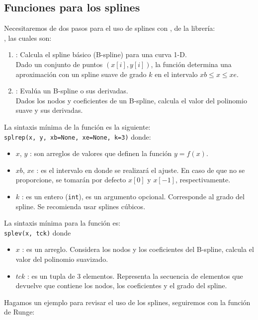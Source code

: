 \subsection*{Funciones para los splines}
Necesitaremos de dos pasos para el uso de splines con \python, de la librería: \\
, las cuales son:
\begin{enumerate}
\item {}: Calcula el spline básico (B-spline) para una curva 1-D.
\\
\medskip
Dado un conjunto de puntos $(x[i],y[i])$, la función determina una aproximación con un spline suave de grado $k$ en el intervalo $xb \leq x \leq xe$.
\item {}: Evalúa un B-spline o sus derivadas.
\\
\medskip
Dados los nodos y coeficientes de un B-spline, calcula el valor del polinomio suave y sus derivadas.
\end{enumerate}
La sintaxis mínima de la función  es la siguiente:
\\
\texttt{splrep(x, y, xb=None, xe=None, k=3)}
donde:
\begin{itemize}
\item $x$, $y$ : son arreglos de valores que definen la función $y = f(x)$.
\item $xb$, $xe$ : es el intervalo en donde se realizará el ajuste. En caso de que no se proporcione, se tomarán por defecto $x[0]$ y $x[-1]$, respectivamente.
\item $k$ : es un entero (\texttt{int}), es un argumento opcional. Corresponde al grado del spline. Se recomienda usar splines cúbicos.
\end{itemize}
La sintaxis mínima para la función  es:
\\
\texttt{splev(x, tck)}
donde
\begin{itemize}
\item $x$ : es un arreglo. Considera los nodos y los coeficientes del B-spline, calcula el valor del polinomio suavizado.
\item $tck$ : es un tupla de 3 elementos. Representa la secuencia de elementos que devuelve  que contiene los nodos, los coeficientes y el grado del spline.
\end{itemize}
Hagamos un ejemplo para revisar el uso de los splines, seguiremos con la función de Runge:
